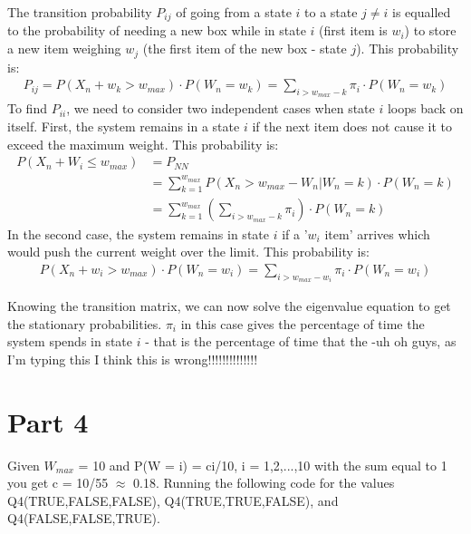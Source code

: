 \documentclass[10pt,a4paper]{article}
\begin{document}
The transition probability $P_{ij}$ of going from a state $i$ to a state $j\neq i$ is equalled to the probability of needing a new box while in state $i$ (first item is $w_i$) to store a new item weighing $w_j$ (the first item of the new box - state $j$). This probability is:\\
\begin{align*}
P_{ij}= P(X_n + w_k > w_{max}) \cdot P( W_n = w_k)= \sum_{i > w_{max} -k} \pi_i \cdot P( W_n = w_k)
\end{align*}
To find $P_{ii}$, we need to consider two independent cases when state $i$ loops back on itself. First, the system remains in a state $i$ if the next item does not cause it to exceed the maximum weight. This probability is:\\
\begin{align*}
P(X_n + W_i \leq w_{max}) &= P_{NN} \\
&= \sum\limits_{k=1}^{w_{max}} P(X_n > w_{max} -W_n | W_n=k)\cdot P(W_n=k) \\
&= \sum\limits_{k=1}^{w_{max}} \left( \sum_{i > w_{max} -k} \pi_i \right) \cdot P(W_n=k)
\end{align*}
In the second case, the system remains in state $i$ if a '$w_i$ item' arrives which would push the current weight over the limit. This probability is:\\
\begin{align*}
P( X_n + w_i > w_{max}) \cdot P( W_n = w_i) =\sum_{i > w_{max} -w_i} \pi_i \cdot P( W_n = w_i)
\end{align*}

Knowing the transition matrix, we can now solve the eigenvalue equation to get the stationary probabilities. $\pi_i$ in this case gives the percentage of time the system spends in state $i$ - that is the percentage of time that the -uh oh guys, as I'm typing this I think this is wrong!!!!!!!!!!!!!!

\section{Part 4}
Given $W_{max}$ = 10 and P(W = i) = ci/10, i = 1,2,...,10 with the sum equal to 1 you get c = 10/55 $\approx$ 0.18. Running the following code for the values Q4(TRUE,FALSE,FALSE), Q4(TRUE,TRUE,FALSE), and Q4(FALSE,FALSE,TRUE).
\end{document}
